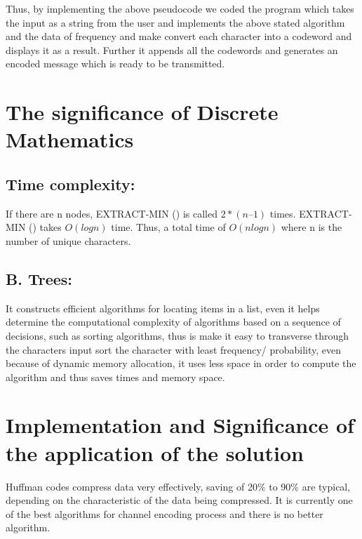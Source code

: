 \documentclass{article}
\begin{document}
\Large{Thus, by implementing the above pseudocode we coded the program which takes the input as a string from the user and implements the above stated algorithm and the data of frequency and make convert each character into a codeword and displays it as a result. Further it appends all the codewords and generates an encoded message which is ready to be transmitted.}

\vspace{1cm}

\section{The significance of Discrete Mathematics }

\subsection{Time complexity:}

\Large{If there are n nodes, EXTRACT-MIN () is called $2*(n – 1)$ times. EXTRACT-MIN () takes $O(logn)$ time. Thus, a total time of $O(nlogn)$ where n is the number of unique characters. }

\subsection{B.	Trees:}

\Large{It constructs efficient algorithms for locating items in a list, even it helps determine the computational complexity of algorithms based on a sequence of decisions, such as sorting algorithms, thus is make it easy to transverse through the characters input sort the character with least frequency/ probability, even because of dynamic memory allocation, it uses less space in order to compute the algorithm and thus saves times and memory space.}

\vspace{1cm}

\section{Implementation and Significance of the application of the solution}

\Large{Huffman codes compress data very effectively, saving of 20\% to 90\% are typical, depending on the characteristic of the data being compressed. It is currently one of the best algorithms for channel encoding process and there is no better algorithm.}
\end{document}
